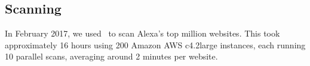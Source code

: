 






\subsection{Scanning} \label{sec:scanning}



In February 2017, we used \SwapScan\ to scan Alexa's top million websites. 
This took approximately 16 hours using 200 Amazon AWS c4.2large instances, each running 10 parallel scans, averaging around 2 minutes per website. 


